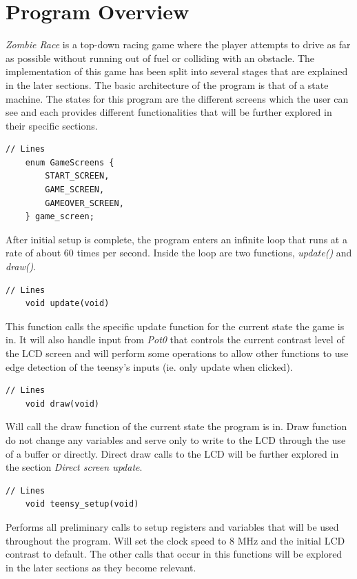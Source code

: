 \documentclass{article}
\begin{document}
\clearpage

\section{Program Overview}
\emph{Zombie Race} is a top-down racing game where the player attempts to drive as far as possible without running out of fuel or colliding with an obstacle. The implementation of this game has been split into several stages that are explained in the later sections. 
\newline
\newline
The basic architecture of the program is that of a state machine. The states for this program are the different screens which the user can see and each provides different functionalities that will be further explored in their specific sections. 
\begin{lstlisting}[style=CStyle]
	// Lines 
	enum GameScreens {
		START_SCREEN,
		GAME_SCREEN,
		GAMEOVER_SCREEN,
	} game_screen;
\end{lstlisting}
After initial setup is complete, the program enters an infinite loop that runs at a rate of about 60 times per second. Inside the loop are two functions, \emph{update()} and \emph{draw()}.
\begin{lstlisting}[style=CStyle]
	// Lines 
	void update(void)
\end{lstlisting}
This function calls the specific update function for the current state the game is in. It will also handle input from \emph{Pot0} that controls the current contrast level of the LCD screen and will perform some operations to allow other functions to use edge detection of the teensy's inputs (ie. only update when clicked). 
\begin{lstlisting}[style=CStyle]
	// Lines 
	void draw(void)
\end{lstlisting}
Will call the draw function of the current state the program is in. Draw function do not change any variables and serve only to write to the LCD through the use of a buffer or directly. Direct draw calls to the LCD will be further explored in the section \emph{Direct screen update}. 
\begin{lstlisting}[style=CStyle]
	// Lines 
	void teensy_setup(void)
\end{lstlisting}
Performs all preliminary calls to setup registers and variables that will be used throughout the program. Will set the clock speed to 8 MHz and the initial LCD contrast to default. The other calls that occur in this functions will be explored in the later sections as they become relevant. 
\clearpage
\end{document}
